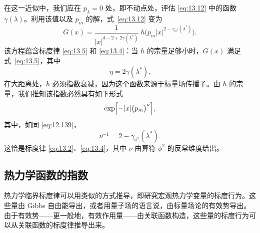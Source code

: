 在这一近似中，我们应在 $p_\lambda = 0$ 处，即不动点处，评估 \eqref{eq:13.12} 中的函数 $\gamma(\lambda)$。利用该值以及 $p_m$ 的解，式~\eqref{eq:13.12} 变为
\begin{equation}
  G(x) = \frac{1}{|x|^{d-2+2\gamma(\lambda^{*})}}\ h\bigl(
    p_m|x|^{2-\gamma_{\phi^2}(\lambda^{*})} \bigr) .
  \label{eq:13.16}
\end{equation}
该方程蕴含标度律 \eqref{eq:13.5} 和 \eqref{eq:13.4}：当 $h$ 的宗量足够小时，$G(x)$ 满足式~\eqref{eq:13.5}，其中
\begin{equation}
  \eta = 2\gamma(\lambda^{*}) .
  \label{eq:13.17}
\end{equation}
在大距离处，$h$ 必须指数衰减，因为这个函数来源于标量场传播子。由 $h$ 的宗量，我们推知该指数必然具有如下形式
\begin{equation}
  \exp\Bigl[ -|x|\bigl( p_m \bigr)^{\nu} \Bigr] ,
  \label{eq:13.18}
\end{equation}
其中，如同 \eqref{eq:12.139}，
\begin{equation}
  \nu^{-1} = 2 - \gamma_{\phi^2}(\lambda^{*}) .
  \label{eq:13.19}
\end{equation}
这恰是标度律 \eqref{eq:13.2}、\eqref{eq:13.4}，其中 $\nu$ 由算符 $\phi^2$ 的反常维度给出。

\subsection{热力学函数的指数}

热力学临界标度律可以用类似的方式推导，即研究宏观热力学变量的标度行为。这些量由 Gibbs 自由能导出，或者用量子场的语言说，由标量场论的有效势导出。由于有效势——更一般地，有效作用量——由关联函数构造，这些量的标度行为可以从关联函数的标度律推导出来。


